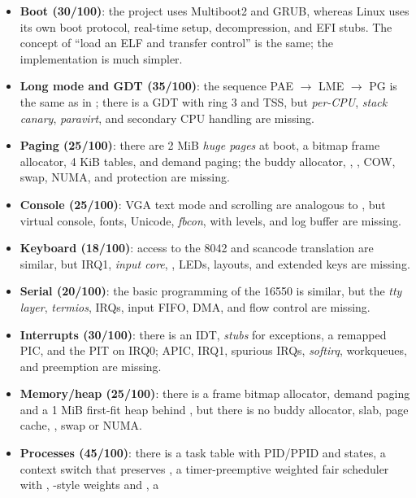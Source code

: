 \begin{itemize}
  \item \textbf{Boot (30/100)}: the project uses Multiboot2 and GRUB, whereas
        Linux uses its own boot protocol, real-time setup, decompression, and
        EFI stubs. The concept of ``load an ELF and transfer control'' is the
        same; the implementation is much simpler.
  \item \textbf{Long mode and GDT (35/100)}: the sequence PAE $\rightarrow$
        LME $\rightarrow$ PG is the same as in ; there is a
        GDT with ring 3 and TSS, but \emph{per-CPU}, \emph{stack canary},
        \emph{paravirt}, and secondary CPU handling are missing.
  \item \textbf{Paging (25/100)}: there are 2 MiB \emph{huge pages} at
        boot, a bitmap frame allocator, 4 KiB tables, and demand
        paging; the buddy allocator, , , COW,
        swap, NUMA, and  protection are missing.
  \item \textbf{Console (25/100)}: VGA text mode and scrolling are
        analogous to , but virtual console, fonts,
        Unicode, \emph{fbcon},  with levels, and log buffer are missing.
  \item \textbf{Keyboard (18/100)}: access to the 8042 and scancode
        translation are similar, but IRQ1, \emph{input core},
        , LEDs, layouts, and extended keys are missing.
  \item \textbf{Serial (20/100)}: the basic programming of the 16550 is
        similar, but the \emph{tty layer}, \emph{termios}, IRQs, input
        FIFO, DMA, and flow control are missing.
  \item \textbf{Interrupts (30/100)}: there is an IDT, \emph{stubs} for
        exceptions, a remapped PIC, and the PIT on IRQ0; APIC, IRQ1,
        spurious IRQs, \emph{softirq}, workqueues, and preemption are missing.
  \item \textbf{Memory/heap (25/100)}: there is a frame bitmap allocator,
        demand paging and a 1 MiB first-fit heap behind
        , but there is no buddy allocator, slab,
        page cache, , swap or NUMA.
  \item \textbf{Processes (45/100)}: there is a task table with PID/PPID and
        states, a context switch that preserves , a
        timer-preemptive weighted fair scheduler with ,
        -style weights and , a

\end{itemize}
